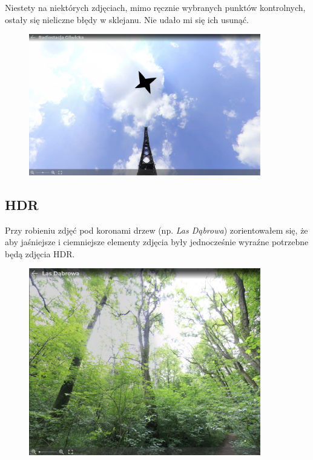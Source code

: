 \documentclass[a4paper]{mwart}
\begin{document}
Niestety na niektórych zdjęciach, mimo ręcznie wybranych punktów kontrolnych,
ostały się nieliczne błędy w sklejanu. Nie udało mi się ich usunąć.
\begin{figure}[H]
\centering
\includegraphics[width=0.9\textwidth]{images/radiostation_error.jpg}
\end{figure}

\subsection{HDR}
Przy robieniu zdjęć pod koronami drzew (np. \textit{Las Dąbrowa}) zorientowałem
się, że aby jaśniejsze i ciemniejsze elementy zdjęcia były jednocześnie wyraźne
potrzebne będą zdjęcia HDR.
\begin{figure}[H]
\centering
\includegraphics[width=0.9\textwidth]{images/dabrowa.jpg}
\end{figure}
\end{document}
